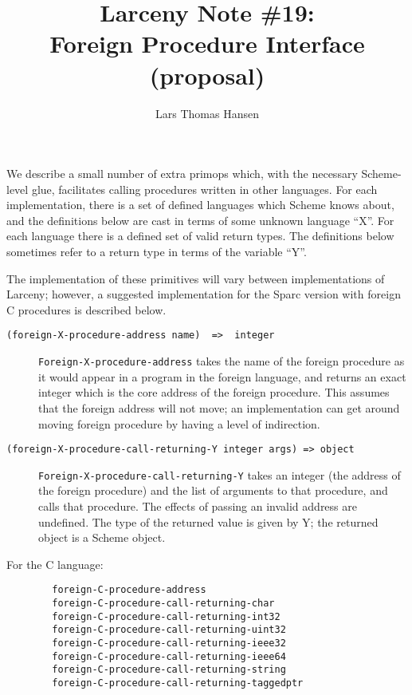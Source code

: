
\title{Larceny Note \#19: \\
       Foreign Procedure Interface \\
       {\tenrm (proposal)}}
\author{Lars Thomas Hansen}


\maketitle

We describe a small number of extra primops which, with the necessary
Scheme-level glue, facilitates calling procedures written in other
languages. For each implementation, there is a set of defined languages
which Scheme knows about, and the definitions below are cast in terms
of some unknown language ``X''. For each language there is a defined set
of valid return types. The definitions below sometimes refer to a return
type in terms of the variable ``Y''.

The implementation of these primitives will vary between implementations
of Larceny; however, a suggested implementation for the Sparc version with
foreign C procedures is described below.

\begin{description}

\item[\verb+(foreign-X-procedure-address name)  =>  integer+]

{\tt Foreign-X-procedure-address} takes the name of the foreign procedure
as it would appear in a program in the foreign language, and returns an
exact integer which is the core address of the foreign procedure. This
assumes that the foreign address will not move; an implementation can
get around moving foreign procedure by having a level of indirection.

\item[\verb+(foreign-X-procedure-call-returning-Y integer args) => object+]

{\tt Foreign-X-procedure-call-returning-Y} takes an integer (the address of
the foreign procedure) and the list of arguments to that procedure, and calls
that procedure. The effects of passing an invalid address are undefined.
The type of the returned value is given by Y; the returned object is a
Scheme object.

\end{description}

For the C language:

\begin{verbatim}
        foreign-C-procedure-address
        foreign-C-procedure-call-returning-char
        foreign-C-procedure-call-returning-int32
        foreign-C-procedure-call-returning-uint32
        foreign-C-procedure-call-returning-ieee32
        foreign-C-procedure-call-returning-ieee64
        foreign-C-procedure-call-returning-string
        foreign-C-procedure-call-returning-taggedptr
\end{verbatim}

